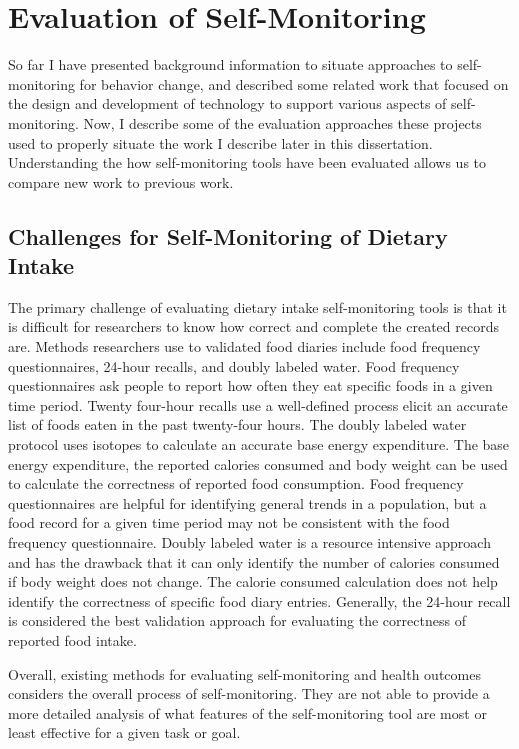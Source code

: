 \section{Evaluation of Self-Monitoring}
So far I have presented background information to situate approaches to self-monitoring for behavior change, and described some related work that focused on the design and development of technology to support various aspects of self-monitoring. Now, I describe some of the evaluation approaches these projects used to properly situate the work I describe later in this dissertation. Understanding the how self-monitoring tools have been evaluated allows us to compare new work to previous work. 

\subsection{Challenges for Self-Monitoring of Dietary Intake}
The primary challenge of evaluating dietary intake self-monitoring tools  is that it is difficult for researchers to know how correct and complete the created records are. Methods researchers use to validated food diaries include food frequency questionnaires, 24-hour recalls, and doubly labeled water. Food frequency questionnaires ask people to report how often they eat specific foods in a given time period. Twenty four-hour recalls use a well-defined process elicit an accurate list of foods eaten in the past twenty-four hours. The doubly labeled water protocol uses isotopes to calculate an accurate base energy expenditure. The base energy expenditure, the reported calories consumed and body weight can be used to calculate the correctness of reported food consumption. Food frequency questionnaires are helpful for identifying general trends in a population, but a food record for a given time period may not be consistent with the food frequency questionnaire. Doubly labeled water is a resource intensive approach and has the drawback that it can only identify the number of calories consumed if body weight does not change. The calorie consumed calculation does not help identify the correctness of specific food diary entries.  Generally, the 24-hour recall is considered the best validation approach for evaluating the correctness of reported food intake. 

Overall, existing methods for evaluating self-monitoring and health outcomes considers the overall process of self-monitoring. They are not able to provide a more detailed analysis of what features of the self-monitoring tool are most or least effective for a given task or goal. 

